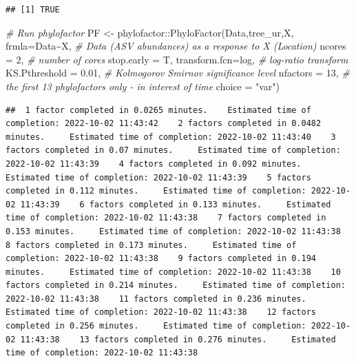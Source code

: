 \documentclass[
]{book}
\newenvironment{Shaded}{\begin{snugshade}}{\end{snugshade}}
\newcommand{\AttributeTok}[1]{\textcolor[rgb]{0.77,0.63,0.00}{#1}}
\newcommand{\CommentTok}[1]{\textcolor[rgb]{0.56,0.35,0.01}{\textit{#1}}}
\newcommand{\DecValTok}[1]{\textcolor[rgb]{0.00,0.00,0.81}{#1}}
\newcommand{\FloatTok}[1]{\textcolor[rgb]{0.00,0.00,0.81}{#1}}
\newcommand{\FunctionTok}[1]{\textcolor[rgb]{0.00,0.00,0.00}{#1}}
\newcommand{\NormalTok}[1]{#1}
\newcommand{\OtherTok}[1]{\textcolor[rgb]{0.56,0.35,0.01}{#1}}
\newcommand{\SpecialCharTok}[1]{\textcolor[rgb]{0.00,0.00,0.00}{#1}}
\newcommand{\StringTok}[1]{\textcolor[rgb]{0.31,0.60,0.02}{#1}}
\begin{document}
\begin{verbatim}
## [1] TRUE
\end{verbatim}

\begin{Shaded}
\begin{Highlighting}[]
\CommentTok{\# Run phylofactor}
\NormalTok{PF }\OtherTok{\textless{}{-}}\NormalTok{  phylofactor}\SpecialCharTok{::}\FunctionTok{PhyloFactor}\NormalTok{(Data,tree\_ur,X, }
        \AttributeTok{frmla=}\NormalTok{Data}\SpecialCharTok{\textasciitilde{}}\NormalTok{X,    }\CommentTok{\# Data (ASV abundances) as a response to X (Location)}
        \AttributeTok{ncores =} \DecValTok{2}\NormalTok{,      }\CommentTok{\# number of cores }
        \AttributeTok{stop.early =}\NormalTok{ T, }
        \AttributeTok{transform.fcn=}\NormalTok{log,    }\CommentTok{\# log{-}ratio transform}
        \AttributeTok{KS.Pthreshold =} \FloatTok{0.01}\NormalTok{, }\CommentTok{\# Kolmogorov Smirnov significance level }
        \AttributeTok{nfactors =} \DecValTok{13}\NormalTok{, }\CommentTok{\# the first 13 phylofactors only {-} in interest of time }
        \AttributeTok{choice =} \StringTok{"var"}\NormalTok{)}
\end{Highlighting}
\end{Shaded}

\begin{verbatim}
##  1 factor completed in 0.0265 minutes.    Estimated time of completion: 2022-10-02 11:43:42    2 factors completed in 0.0482 minutes.     Estimated time of completion: 2022-10-02 11:43:40    3 factors completed in 0.07 minutes.     Estimated time of completion: 2022-10-02 11:43:39    4 factors completed in 0.092 minutes.     Estimated time of completion: 2022-10-02 11:43:39    5 factors completed in 0.112 minutes.     Estimated time of completion: 2022-10-02 11:43:39    6 factors completed in 0.133 minutes.     Estimated time of completion: 2022-10-02 11:43:38    7 factors completed in 0.153 minutes.     Estimated time of completion: 2022-10-02 11:43:38    8 factors completed in 0.173 minutes.     Estimated time of completion: 2022-10-02 11:43:38    9 factors completed in 0.194 minutes.     Estimated time of completion: 2022-10-02 11:43:38    10 factors completed in 0.214 minutes.     Estimated time of completion: 2022-10-02 11:43:38    11 factors completed in 0.236 minutes.     Estimated time of completion: 2022-10-02 11:43:38    12 factors completed in 0.256 minutes.     Estimated time of completion: 2022-10-02 11:43:38    13 factors completed in 0.276 minutes.     Estimated time of completion: 2022-10-02 11:43:38   
\end{verbatim}
\end{document}
